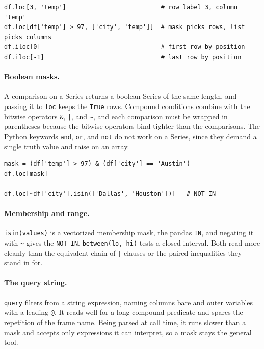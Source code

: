 \begin{lstlisting}[style=python, caption={Label access, position access, filtered selection}]
df.loc[3, 'temp']                          # row label 3, column 'temp'
df.loc[df['temp'] > 97, ['city', 'temp']]  # mask picks rows, list picks columns
df.iloc[0]                                 # first row by position
df.iloc[-1]                                # last row by position
\end{lstlisting}

\vspace{-2ex}

\paragraph{Boolean masks.} A comparison on a Series returns a boolean Series of the same length, and passing it to \texttt{loc} keeps the \texttt{True} rows. Compound conditions combine with the bitwise operators \texttt{\&}, \texttt{|}, and \texttt{\textasciitilde}, and each comparison must be wrapped in parentheses because the bitwise operators bind tighter than the comparisons. The Python keywords \texttt{and}, \texttt{or}, and \texttt{not} do not work on a Series, since they demand a single truth value and raise on an array.

\newpage

\begin{lstlisting}[style=python, caption={Combine masks with bitwise operators, parenthesize each side}]
mask = (df['temp'] > 97) & (df['city'] == 'Austin')
df.loc[mask]

df.loc[~df['city'].isin(['Dallas', 'Houston'])]   # NOT IN
\end{lstlisting}

\vspace{-3ex}

\paragraph{Membership and range.} \texttt{isin(values)} is a vectorized membership mask, the pandas \texttt{IN}, and negating it with \texttt{\textasciitilde} gives the \texttt{NOT IN}. \texttt{between(lo, hi)} tests a closed interval. Both read more cleanly than the equivalent chain of \texttt{|} clauses or the paired inequalities they stand in for.

\paragraph{The query string.} \texttt{query} filters from a string expression, naming columns bare and outer variables with a leading \texttt{@}. It reads well for a long compound predicate and spares the repetition of the frame name. Being parsed at call time, it runs slower than a mask and accepts only expressions it can interpret, so a mask stays the general tool.

